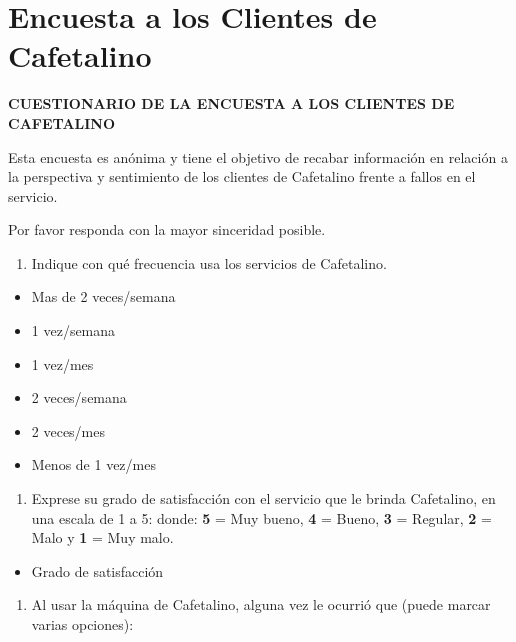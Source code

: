 \section{Encuesta a los Clientes de Cafetalino}\label{anexo-encuesta-a-los-clientes-de-cafetalino}

\textbf{CUESTIONARIO DE LA ENCUESTA A LOS CLIENTES DE CAFETALINO}

Esta encuesta es anónima y tiene el objetivo de recabar información en relación a la perspectiva y sentimiento de los clientes de Cafetalino frente a fallos en el servicio.

Por favor responda con la mayor sinceridad posible.

\begin{enumerate}
\def\labelenumi{\arabic{enumi}.}
\item
  Indique con qué frecuencia usa los servicios de Cafetalino.
\end{enumerate}

\begin{itemize}[label=$\square$,itemsep=1pt,leftmargin=3em]
\item Mas de 2 veces/semana
\item 1 vez/semana
\item 1 vez/mes
\item 2 veces/semana
\item 2 veces/mes
\item Menos de 1 vez/mes
\end{itemize}

\begin{enumerate}
\def\labelenumi{\arabic{enumi}.}
\setcounter{enumi}{1}
\item
  Exprese su grado de satisfacción con el servicio que le brinda Cafetalino, en una escala de 1 a 5: donde: \textbf{5} = Muy bueno, \textbf{4} = Bueno, \textbf{3} = Regular, \textbf{2} = Malo y \textbf{1} = Muy malo.
\end{enumerate}

\begin{itemize}[label=$\square$,itemsep=1pt,leftmargin=3em]
\item Grado de satisfacción
\end{itemize}

\begin{enumerate}
\def\labelenumi{\arabic{enumi}.}
\setcounter{enumi}{2}
\item
  Al usar la máquina de Cafetalino, alguna vez le ocurrió que (puede marcar varias opciones):
\end{enumerate}

